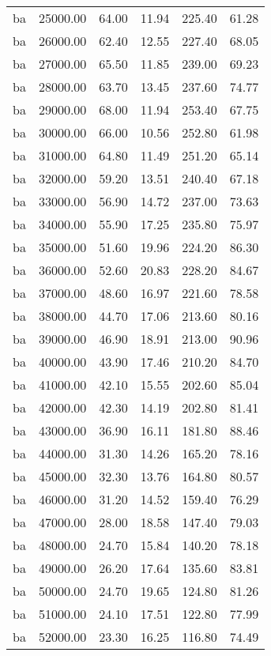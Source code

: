 \begin{table}[ht]
\begin{table}[ht]
\begin{tabular}{|cccccc}
  ba & 25000.00 & 64.00 & 11.94 & 225.40 & 61.28 \\ 
  ba & 26000.00 & 62.40 & 12.55 & 227.40 & 68.05 \\ 
  ba & 27000.00 & 65.50 & 11.85 & 239.00 & 69.23 \\ 
  ba & 28000.00 & 63.70 & 13.45 & 237.60 & 74.77 \\ 
  ba & 29000.00 & 68.00 & 11.94 & 253.40 & 67.75 \\ 
  ba & 30000.00 & 66.00 & 10.56 & 252.80 & 61.98 \\ 
  ba & 31000.00 & 64.80 & 11.49 & 251.20 & 65.14 \\ 
  ba & 32000.00 & 59.20 & 13.51 & 240.40 & 67.18 \\ 
  ba & 33000.00 & 56.90 & 14.72 & 237.00 & 73.63 \\ 
  ba & 34000.00 & 55.90 & 17.25 & 235.80 & 75.97 \\ 
  ba & 35000.00 & 51.60 & 19.96 & 224.20 & 86.30 \\ 
  ba & 36000.00 & 52.60 & 20.83 & 228.20 & 84.67 \\ 
  ba & 37000.00 & 48.60 & 16.97 & 221.60 & 78.58 \\ 
  ba & 38000.00 & 44.70 & 17.06 & 213.60 & 80.16 \\ 
  ba & 39000.00 & 46.90 & 18.91 & 213.00 & 90.96 \\ 
  ba & 40000.00 & 43.90 & 17.46 & 210.20 & 84.70 \\ 
  ba & 41000.00 & 42.10 & 15.55 & 202.60 & 85.04 \\ 
  ba & 42000.00 & 42.30 & 14.19 & 202.80 & 81.41 \\ 
  ba & 43000.00 & 36.90 & 16.11 & 181.80 & 88.46 \\ 
  ba & 44000.00 & 31.30 & 14.26 & 165.20 & 78.16 \\ 
  ba & 45000.00 & 32.30 & 13.76 & 164.80 & 80.57 \\ 
  ba & 46000.00 & 31.20 & 14.52 & 159.40 & 76.29 \\ 
  ba & 47000.00 & 28.00 & 18.58 & 147.40 & 79.03 \\ 
  ba & 48000.00 & 24.70 & 15.84 & 140.20 & 78.18 \\ 
  ba & 49000.00 & 26.20 & 17.64 & 135.60 & 83.81 \\ 
  ba & 50000.00 & 24.70 & 19.65 & 124.80 & 81.26 \\ 
  ba & 51000.00 & 24.10 & 17.51 & 122.80 & 77.99 \\ 
  ba & 52000.00 & 23.30 & 16.25 & 116.80 & 74.49 \\ 

\end{tabular}
\end{table}
\end{table}
